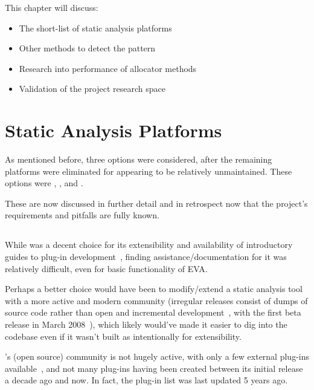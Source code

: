 This chapter will discuss:

\begin{itemize}
	\item The short-list of static analysis platforms
	\item Other methods to detect the pattern
	\item Research into performance of allocator methods
	\item Validation of the project research space
\end{itemize}

\section{Static Analysis Platforms}

As mentioned before, three options were considered, after the remaining platforms were eliminated for appearing to be relatively unmaintained. These options were , , and .

These are now discussed in further detail and in retrospect now that the project's requirements and pitfalls are fully known.

\subsection{}

While  was a decent choice for its extensibility and availability of introductory guides to plug-in development~\cite{framaplug}, finding assistance/documentation for it was relatively difficult, even for basic functionality of EVA.

Perhaps a better choice would have been to modify/extend a static analysis tool with a more active and modern community (irregular releases consist of dumps of source code rather than open and incremental development~\cite{framagit}, with the first beta release in March 2008~\cite{framahydrogen}), which likely would've made it easier to dig into the codebase even if it wasn't built as intentionally for extensibility.

's (open source) community is not hugely active, with only a few external plug-ins available~\cite{framapluglist}, and not many plug-ins having been created between its initial release a decade ago and now. In fact, the plug-in list was last updated 5 years ago.

\subsection{}

